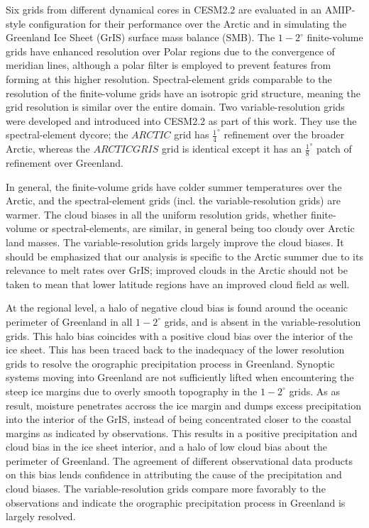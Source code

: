 \documentclass[draft]{agujournal2019}
\begin{document}
Six grids from different dynamical cores in CESM2.2 are evaluated in an AMIP-style configuration for their performance over the Arctic and in simulating the Greenland Ice Sheet (GrIS) surface mass balance (SMB). The $1-2^{\circ}$ finite-volume grids have enhanced resolution over Polar regions due to the convergence of meridian lines, although a polar filter is employed to prevent features from forming at this higher resolution. Spectral-element grids comparable to the resolution of the finite-volume grids have an isotropic grid structure, meaning the grid resolution is similar over the entire domain. Two variable-resolution grids were developed and introduced into CESM2.2 as part of this work. They use the spectral-element dycore; the $ARCTIC$ grid has $\frac{1}{4}^{\circ}$ refinement over the broader Arctic, whereas the $ARCTICGRIS$ grid is identical except it has an $\frac{1}{8}^{\circ}$ patch of refinement over Greenland.

In general, the finite-volume grids have colder summer temperatures over the Arctic, and the spectral-element grids (incl. the variable-resolution grids) are warmer. The cloud biases in all the uniform resolution grids, whether finite-volume or spectral-elements, are similar, in general being too cloudy over Arctic land masses. The variable-resolution grids largely improve the cloud biases. It should be emphasized that our analysis is specific to the Arctic summer due to its relevance to melt rates over GrIS; improved clouds in the Arctic should not be taken to mean that lower latitude regions have an improved cloud field as well.

At the regional level, a halo of negative cloud bias is found around the oceanic perimeter of Greenland in all $1-2^{\circ}$ grids, and is absent in the variable-resolution grids. This halo bias coincides with a positive cloud bias over the interior of the ice sheet. This has been traced back to the inadequacy of the lower resolution grids to resolve the orographic precipitation process in Greenland. Synoptic systems moving into Greenland are not sufficiently lifted when encountering the steep ice margins due to overly smooth topography in the $1-2^{\circ}$ grids. As as result, moisture penetrates accross the ice margin and dumps excess precipitation into the interior of the GrIS, instead of being concentrated closer to the coastal margins as indicated by observations. This results in a positive precipitation and cloud bias in the ice sheet interior, and a halo of low cloud bias about the perimeter of Greenland. The agreement of different observational data products on this bias lends confidence  in attributing the cause of the precipitation and cloud biases. The variable-resolution grids compare more favorably to the observations and indicate the orographic precipitation process in Greenland is largely resolved.
\end{document}

